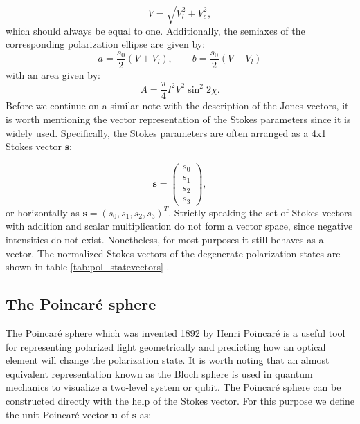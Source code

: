 \begin{equation}
    V = \sqrt{V_l^2 + V_c^2},
\end{equation}
which should always be equal to one. Additionally, the semiaxes of the corresponding polarization ellipse are given by:
\begin{equation}
    a=\frac{s_0}{2}(V+V_l), \qquad b=\frac{s_0}{2}(V-V_l)
\end{equation}
with an area given by:
\begin{equation}
    A=\frac{\pi}{4}I^2V^2\sin^2 2\chi.
\end{equation}
Before we continue on a similar note with the description of the Jones vectors, it is worth mentioning the vector representation of the Stokes parameters since it is widely used. Specifically, the Stokes parameters are often arranged as a 4x1 Stokes vector $\bm{s}$:

\begin{equation}
    \bm{s}=
    \begin{pmatrix}
    s_0 \\
    s_1 \\
    s_2 \\
    s_3
    \end{pmatrix},
\end{equation}
or horizontally as $\bm{s}=(s_0, s_1, s_2, s_3)^T$. Strictly speaking the set of Stokes vectors with addition and scalar multiplication do not form a vector space, since negative intensities do not exist. Nonetheless, for most purposes it still behaves as a vector. The normalized Stokes vectors of the degenerate polarization states are shown in table \ref{tab:pol_statevectors} \cite{HechtOpticsEdition, Shurcliff1962PolarizedLight, GilPerez2017PolarizedApproach}.

\subsection{The Poincaré sphere}
\label{sec:the_poincare_sphere}
The Poincaré sphere which was invented 1892 by Henri Poincaré is a useful tool for representing polarized light geometrically and predicting how an optical element will change the polarization state. It is worth noting that an almost equivalent representation known as the Bloch sphere is used in quantum mechanics to visualize a two-level system or qubit. The Poincaré sphere can be constructed directly with the help of the Stokes vector. For this purpose we define the unit Poincaré vector $\bm{u}$ of $\bm{s}$ as:

